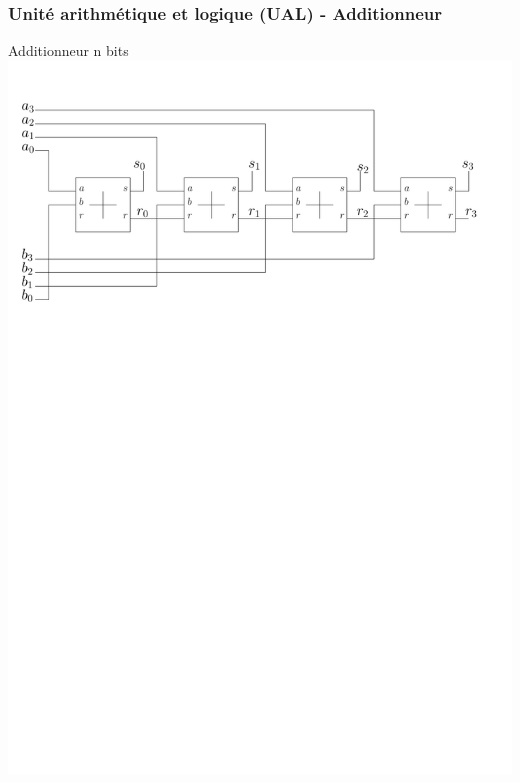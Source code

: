 \documentclass{beamer}
\begin{document}
\begin{frame}
\frametitle{Unité arithmétique et logique (UAL) - Additionneur}
\begin{block}{Additionneur n bits}
\centering\includegraphics[width=0.75\linewidth]{Figs/adder_n.pdf}
\end{block}
\end{frame}
\end{document}
